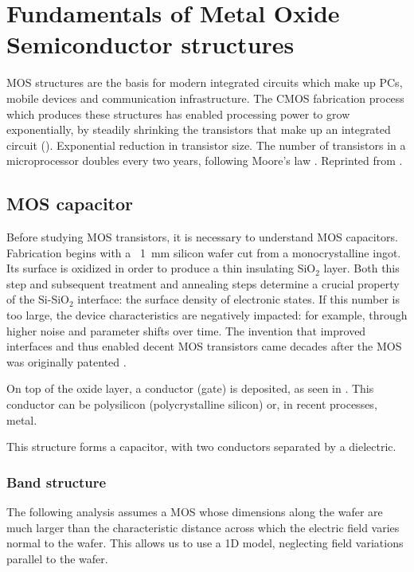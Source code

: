 \section{Fundamentals of Metal Oxide Semiconductor structures}
MOS structures are the basis for modern integrated circuits
which make up PCs, mobile devices and communication infrastructure.
The CMOS fabrication process which produces these structures
has enabled processing power to grow exponentially,
by steadily shrinking the transistors that make up an integrated circuit
().
{Exponential reduction in transistor size.
The number of transistors in a microprocessor doubles every two years,
following Moore's law
\cite{moore_cramming_2006}.
Reprinted from \cite{sedra_microelectronic_2010}.}
\subsection{MOS capacitor}
Before studying MOS transistors, it is necessary to understand MOS capacitors.
Fabrication begins with a ~\SI{1}{\milli\meter} silicon wafer cut from a monocrystalline ingot.
Its surface is oxidized in order to produce a thin insulating SiO$_2$ layer.
Both this step and subsequent treatment and annealing steps
determine a crucial property of the Si-SiO$_2$ interface:
the surface density of electronic states.
If this number is too large, the device characteristics are negatively impacted:
for example, through higher noise and parameter shifts over time.
The invention that improved interfaces and thus enabled decent MOS transistors
came decades after the MOS was originally patented
\cite{chih-tang_evolution_1988}.

On top of the oxide layer, a conductor (gate) is deposited,
as seen in .
This conductor can be polysilicon (polycrystalline silicon) or,
in recent processes, metal.

This structure forms a capacitor, with two conductors separated by a dielectric.
%
\subsubsection{Band structure}
The following analysis assumes a MOS whose dimensions along the wafer
are much larger than the characteristic distance 
across which the electric field varies normal to the wafer.
This allows us to use a 1D model,
neglecting field variations parallel to the wafer.

